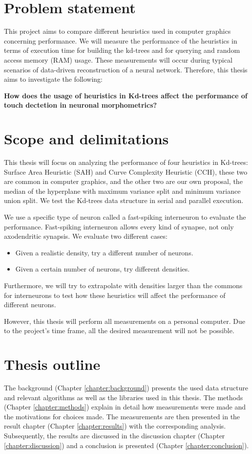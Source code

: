 \section{Problem statement}
This project aims to compare different heuristics used in computer graphics concerning performance. We will measure the performance of the heuristics in terms of execution time for building the kd-trees and for querying and random access memory (RAM) usage. These measurements will occur during typical scenarios of data-driven reconstruction of a neural network. Therefore, this thesis aims to investigate the following:

\textbf{How does the usage of heuristics in Kd-trees affect the performance of touch dectetion in neuronal morphometrics? }

\section{Scope and delimitations}
This thesis will focus on analyzing the performance of four heuristics in Kd-trees: Surface Area Heuristic (SAH) and Curve Complexity Heuristic (CCH), these two are common in computer graphics, and the other two are our own proposal, the median of the hyperplane with maximum variance split and minimum variance union split. We test the Kd-trees data structure in serial and parallel execution.

We use a specific type of neuron called a fast-spiking interneuron to evaluate the performance. Fast-spiking interneuron allows every kind of synapse, not only axodendritic synapsis. We evaluate two different cases: 
\begin{itemize}
    \item Given a realistic density, try a different number of neurons.
    \item Given a certain number of neurons, try different densities. 
\end{itemize}
Furthermore, we will try to extrapolate with densities larger than the commons for interneurons to test how these heuristics will affect the performance of different neurons.

However, this thesis will perform all measurements on a personal computer. Due to the project's time frame, all the desired measurement will not be possible.

\section{Thesis outline}
The background (Chapter \ref{chapter:background}) presents the used data structure and relevant algorithms as well as the libraries used in this thesis. The methods (Chapter \ref{chapter:methods}) explain in detail how measurements were made and the motivations for choices made. The measurements are then presented in the result chapter (Chapter \ref{chapter:results}) with the corresponding analysis. Subsequently, the results are discussed in the discussion chapter (Chapter \ref{chapter:discussion}) and a conclusion is presented  (Chapter \ref{chapter:conclusion}).
